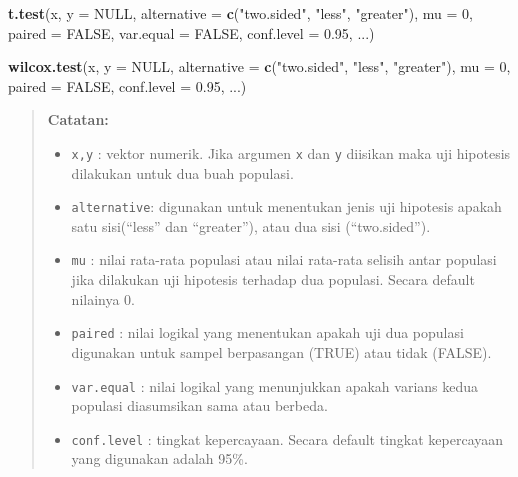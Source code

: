 \documentclass[]{book}
\newenvironment{Shaded}{\begin{snugshade}}{\end{snugshade}}
\newcommand{\DataTypeTok}[1]{\textcolor[rgb]{0.13,0.29,0.53}{#1}}
\newcommand{\DecValTok}[1]{\textcolor[rgb]{0.00,0.00,0.81}{#1}}
\newcommand{\FloatTok}[1]{\textcolor[rgb]{0.00,0.00,0.81}{#1}}
\newcommand{\KeywordTok}[1]{\textcolor[rgb]{0.13,0.29,0.53}{\textbf{#1}}}
\newcommand{\NormalTok}[1]{#1}
\newcommand{\OtherTok}[1]{\textcolor[rgb]{0.56,0.35,0.01}{#1}}
\newcommand{\StringTok}[1]{\textcolor[rgb]{0.31,0.60,0.02}{#1}}
\providecommand{\tightlist}{%
  \setlength{\itemsep}{0pt}\setlength{\parskip}{0pt}}
\theoremstyle{definition}
\theoremstyle{definition}
\theoremstyle{definition}
\theoremstyle{remark}
\begin{document}
\begin{Shaded}
\begin{Highlighting}[]
\KeywordTok{t.test}\NormalTok{(x, }\DataTypeTok{y =} \OtherTok{NULL}\NormalTok{,}
       \DataTypeTok{alternative =} \KeywordTok{c}\NormalTok{(}\StringTok{"two.sided"}\NormalTok{, }\StringTok{"less"}\NormalTok{, }\StringTok{"greater"}\NormalTok{),}
       \DataTypeTok{mu =} \DecValTok{0}\NormalTok{, }\DataTypeTok{paired =} \OtherTok{FALSE}\NormalTok{, }\DataTypeTok{var.equal =} \OtherTok{FALSE}\NormalTok{,}
       \DataTypeTok{conf.level =} \FloatTok{0.95}\NormalTok{, ...)}

\KeywordTok{wilcox.test}\NormalTok{(x, }\DataTypeTok{y =} \OtherTok{NULL}\NormalTok{,}
            \DataTypeTok{alternative =} \KeywordTok{c}\NormalTok{(}\StringTok{"two.sided"}\NormalTok{, }\StringTok{"less"}\NormalTok{, }\StringTok{"greater"}\NormalTok{),}
            \DataTypeTok{mu =} \DecValTok{0}\NormalTok{, }\DataTypeTok{paired =} \OtherTok{FALSE}\NormalTok{, }\DataTypeTok{conf.level =} \FloatTok{0.95}\NormalTok{, ...)}
\end{Highlighting}
\end{Shaded}

\begin{quote}
\textbf{Catatan:}

\begin{itemize}
\tightlist
\item
  \texttt{x,y} : vektor numerik. Jika argumen \texttt{x} dan \texttt{y} diisikan maka uji hipotesis dilakukan untuk dua buah populasi.
\item
  \texttt{alternative}: digunakan untuk menentukan jenis uji hipotesis apakah satu sisi(``less'' dan ``greater''), atau dua sisi (``two.sided'').
\item
  \texttt{mu} : nilai rata-rata populasi atau nilai rata-rata selisih antar populasi jika dilakukan uji hipotesis terhadap dua populasi. Secara default nilainya 0.
\item
  \texttt{paired} : nilai logikal yang menentukan apakah uji dua populasi digunakan untuk sampel berpasangan (TRUE) atau tidak (FALSE).
\item
  \texttt{var.equal} : nilai logikal yang menunjukkan apakah varians kedua populasi diasumsikan sama atau berbeda.
\item
  \texttt{conf.level} : tingkat kepercayaan. Secara default tingkat kepercayaan yang digunakan adalah 95\%.
\end{itemize}
\end{quote}
\end{document}
